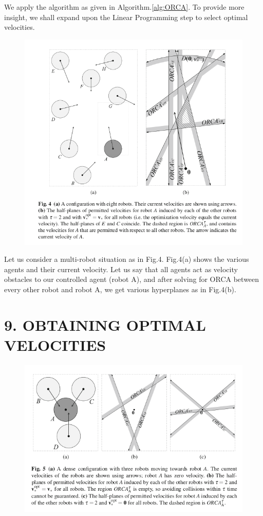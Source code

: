 \documentclass[12pt]{report}
\begin{document}
We apply the algorithm as given in Algorithm.\ref{alg:ORCA}. To provide more insight, we shall expand upon the Linear Programming step to select optimal velocities.

\renewcommand{\thefigure}{4}
\begin{figure}[H]
	\centering
	\includegraphics[scale=0.75]{Algo.png}  \label{fig:algo}
\end{figure}

Let us consider a multi-robot situation as in Fig.4. Fig.4(a) shows the various agents and their current velocity. Let us say that all agents act as velocity obstacles to our controlled agent (robot A), and after solving for ORCA between every other robot and robot A, we get various hyperplanes as in Fig.4(b). 

\chapter*{9. OBTAINING OPTIMAL VELOCITIES}

\renewcommand{\thefigure}{5}
\begin{figure}[h]
	\centering
	\includegraphics[scale=0.75]{vopt.png}  \label{fig:vopt}
\end{figure}
\end{document}
